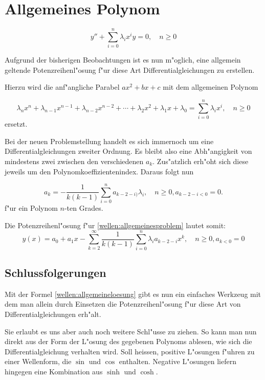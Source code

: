 \section{Allgemeines Polynom}

\begin{equation}
	y''+\sum_{i=0}^{n}\lambda_ix^i y=0, \quad n \ge 0
	\label{wellen:allgemeinesproblem}
\end{equation}

Aufgrund der bisherigen Beobachtungen ist es nun m"oglich, eine 
allgemein geltende Potenzreihenl"osung f"ur diese Art Differentialgleichungen 
zu erstellen.

Hierzu wird die anf"angliche Parabel $ax^2 + bx + c$ mit dem allgemeinen Polynom

\begin{equation*}
	\lambda_nx^n + \lambda_{n-1}x^{n-1} + \lambda_{n-2}x^{n-2} + \dotsb + 
	\lambda_2x^2 + \lambda_1x + \lambda_0 = \sum_{i=0}^{n}\lambda_ix^i, \quad n 
	\ge 0
\end{equation*}
ersetzt.

Bei der neuen Problemstellung handelt es sich immernoch um eine 
Differentialgleichungen zweiter Ordnung. Es bleibt also eine Abh"angigkeit von 
mindestens zwei zwischen den verschiedenen $a_k$. Zus"atzlich erh"oht sich 
diese jeweils um den Polynomkoeffizientenindex. Daraus folgt nun

\begin{equation*}
	a_k = -\frac{1}{k(k-1)}\sum_{i=0}^{n}a_{k-2-i)}\lambda_i, \quad n \ge 0, 
	a_{k-2-i < 0} =  0.
\end{equation*}
f"ur ein Polynom $n$-ten Grades.

Die Potenzreihenl"osung f"ur \ref{wellen:allgemeinesproblem} lautet somit:
\begin{equation}
	y(x) = a_0 + a_1x - \sum_{k=2}^{\infty}\frac{1}{k(k-1)}\sum_{i=0}^{n}
	\lambda_ia_{k-2-i}x^k, \quad n \ge 0, a_{k < 0} = 0
	\label{wellen:allgemeineloesung}
\end{equation}

\subsection{Schlussfolgerungen}

Mit der Formel \ref{wellen:allgemeineloesung} gibt es nun ein einfaches 
Werkzeug mit dem man allein durch Einsetzen die Potenzreihenl"osung f"ur 
diese Art von Differentialgleichungen erh"alt.

Sie erlaubt es uns aber auch noch weitere Schl"usse zu ziehen. So kann man 
nun direkt aus der Form der L"osung des gegebenen Polynoms ablesen, wie sich 
die Differentialgleichung verhalten wird. Soll heissen, positive L"osungen 
f"uhren zu einer Wellenform, die $\sin$ und $\cos$ enthalten. Negative 
L"osungen liefern hingegen eine Kombination aus $\sinh$ und $\cosh$.

